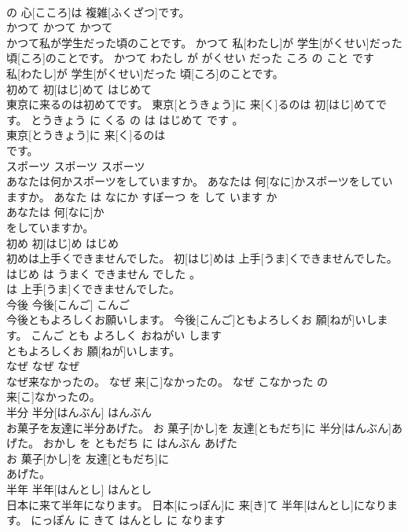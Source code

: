 \documentclass[8pt]{extreport}
\begin{document}
\begin{CJK}{UTF8}{min}
\\	の 心[こころ]は 複雑[ふくざつ]です。			
\\	かつて	かつて	かつて	
\\	かつて私が学生だった頃のことです。	かつて 私[わたし]が 学生[がくせい]だった 頃[ころ]のことです。	かつて わたし が がくせい だった ころ の こと です	
\\	私[わたし]が 学生[がくせい]だった 頃[ころ]のことです。			
\\	初めて	初[はじ]めて	はじめて	
\\	東京に来るのは初めてです。	東京[とうきょう]に 来[く]るのは 初[はじ]めてです。	とうきょう に くる の は はじめて です 。	
\\	東京[とうきょう]に 来[く]るのは
\\	です。			
\\	スポーツ	スポーツ	スポーツ	
\\	あなたは何かスポーツをしていますか。	あなたは 何[なに]かスポーツをしていますか。	あなた は なにか すぽーつ を して います か	
\\	あなたは 何[なに]か
\\	をしていますか。			
\\	初め	初[はじ]め	はじめ	
\\	初めは上手くできませんでした。	初[はじ]めは 上手[うま]くできませんでした。	はじめ は うまく できません でした 。	
\\	は 上手[うま]くできませんでした。			
\\	今後	今後[こんご]	こんご	
\\	今後ともよろしくお願いします。	今後[こんご]ともよろしくお 願[ねが]いします。	こんご とも よろしく おねがい します	
\\	ともよろしくお 願[ねが]いします。			
\\	なぜ	なぜ	なぜ	
\\	なぜ来なかったの。	なぜ 来[こ]なかったの。	なぜ こなかった の	
\\	来[こ]なかったの。			
\\	半分	半分[はんぶん]	はんぶん	
\\	お菓子を友達に半分あげた。	お 菓子[かし]を 友達[ともだち]に 半分[はんぶん]あげた。	おかし を ともだち に はんぶん あげた	
\\	お 菓子[かし]を 友達[ともだち]に
\\	あげた。			
\\	半年	半年[はんとし]	はんとし	
\\	日本に来て半年になります。	日本[にっぽん]に 来[き]て 半年[はんとし]になります。	にっぽん に きて はんとし に なります	

\end{CJK}
\end{document}

